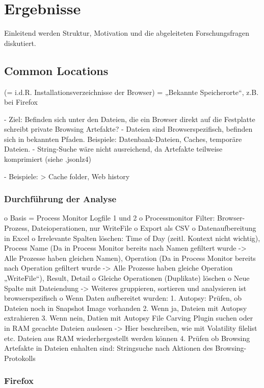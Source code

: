 \chapter{Ergebnisse}

Einleitend werden Struktur, Motivation und die abgeleiteten Forschungsfragen diskutiert.

\section{Common Locations}

(= i.d.R. Installationsverzeichnisse der Browser) = „Bekannte Speicherorte“, z.B. bei Firefox   

-	Ziel: Befinden sich unter den Dateien, die ein Browser direkt auf die Festplatte schreibt private Browsing Artefakte?
-	Dateien sind Browserspezifisch, befinden sich in bekannten Pfaden. Beispiele: Datenbank-Dateien, Caches, temporäre Dateien.
-	String-Suche wäre nicht ausreichend, da Artefakte teilweise komprimiert (siehe .jsonlz4)

- Beispiele:
	> Cache folder, Web history \cite{Montasari.2015}

\subsection*{Durchführung der Analyse}

o	Basis = Process Monitor Logfile 1 und 2
o	Processmonitor Filter: Browser-Prozess, Dateioperationen, nur WriteFile
o	Export als CSV
o	Datenaufbereitung in Excel
	o	Irrelevante Spalten löschen: Time of Day (zeitl. Kontext nicht wichtig), Process Name (Da in Process Monitor bereits nach Namen gefiltert wurde -> Alle Prozesse haben gleichen Namen), Operation (Da in Process Monitor bereits nach Operation gefiltert wurde -> Alle Prozesse haben gleiche Operation „WriteFile“), Result, Detail
	o	Gleiche Operationen (Duplikate) löschen
	o	Neue Spalte mit Dateiendung
		-> Weiteres gruppieren, sortieren und analysieren ist browserspezifisch
	o	Wenn Daten aufbereitet wurden: 
		1.	Autopsy: Prüfen, ob Dateien noch in Snapshot Image vorhanden
		2.	Wenn ja, Dateien mit Autopsy extrahieren 
		3.	Wenn nein, Datien mit Autopsy File Carving Plugin suchen oder in RAM gecachte Dateien auslesen 
			-> Hier beschreiben, wie mit Volatility filelist etc. Dateien aus RAM wiederhergestellt werden können
		4.	Prüfen ob Browsing Artefakte in Dateien enhalten sind: Stringsuche nach Aktionen des Browsing-Protokolls


\subsection{Firefox}

